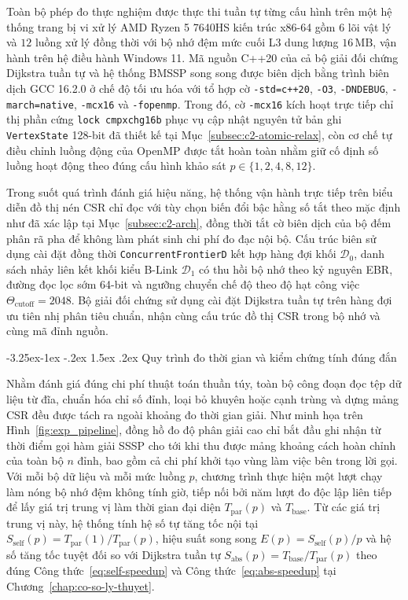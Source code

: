 \documentclass[12pt,a4paper,openany,oneside]{report}
\makeatletter
\theoremstyle{plain}
\renewcommand\subsection{\@startsection{subsection}{2}{\z@}
    {-3.25ex\@plus -1ex \@minus -.2ex}
    {1.5ex \@plus .2ex}
    {\normalfont\normalsize\bfseries}}
\numberwithin{equation}{section}
\makeatother
\begin{document}
Toàn bộ phép đo thực nghiệm được thực thi tuần tự từng cấu hình trên một hệ thống trang bị vi xử lý AMD Ryzen 5 7640HS kiến trúc x86-64 gồm $6$ lõi vật lý và $12$ luồng xử lý đồng thời với bộ nhớ đệm mức cuối L3 dung lượng $16\,\mathrm{MB}$, vận hành trên hệ điều hành Windows 11. Mã nguồn C++20 của cả bộ giải đối chứng Dijkstra tuần tự và hệ thống BMSSP song song được biên dịch bằng trình biên dịch GCC 16.2.0 ở chế độ tối ưu hóa với tổ hợp cờ \texttt{-std=c++20}, \texttt{-O3}, \texttt{-DNDEBUG}, \texttt{-march=native}, \texttt{-mcx16} và \texttt{-fopenmp}. Trong đó, cờ \texttt{-mcx16} kích hoạt trực tiếp chỉ thị phần cứng \texttt{lock cmpxchg16b} phục vụ cập nhật nguyên tử bản ghi \texttt{VertexState} 128-bit đã thiết kế tại Mục~\ref{subsec:c2-atomic-relax}, còn cơ chế tự điều chỉnh luồng động của OpenMP được tắt hoàn toàn nhằm giữ cố định số luồng hoạt động theo đúng cấu hình khảo sát $p \in \{1, 2, 4, 8, 12\}$.

Trong suốt quá trình đánh giá hiệu năng, hệ thống vận hành trực tiếp trên biểu diễn đồ thị nén CSR chỉ đọc với tùy chọn biến đổi bậc hằng số tắt theo mặc định như đã xác lập tại Mục~\ref{subsec:c2-arch}, đồng thời tắt cờ biên dịch của bộ đếm phân rã pha để không làm phát sinh chi phí đo đạc nội bộ. Cấu trúc biên sử dụng cài đặt đồng thời \texttt{Concurrent\allowbreak FrontierD} kết hợp hàng đợi khối $\mathcal{D}_0$, danh sách nhảy liên kết khối kiểu B-Link $\mathcal{D}_1$ có thu hồi bộ nhớ theo kỷ nguyên EBR, đường đọc lọc sớm 64-bit và ngưỡng chuyển chế độ theo độ hạt công việc $\Theta_{\mathrm{cutoff}} = 2048$. Bộ giải đối chứng sử dụng cài đặt Dijkstra tuần tự trên hàng đợi ưu tiên nhị phân tiêu chuẩn, nhận cùng cấu trúc đồ thị CSR trong bộ nhớ và cùng mã đỉnh nguồn.

\subsection{Quy trình đo thời gian và kiểm chứng tính đúng đắn}\label{subsec:c3-phuong-phap}

Nhằm đánh giá đúng chi phí thuật toán thuần túy, toàn bộ công đoạn đọc tệp dữ liệu từ đĩa, chuẩn hóa chỉ số đỉnh, loại bỏ khuyên hoặc cạnh trùng và dựng mảng CSR đều được tách ra ngoài khoảng đo thời gian giải. Như minh họa trên Hình~\ref{fig:exp_pipeline}, đồng hồ đo độ phân giải cao chỉ bắt đầu ghi nhận từ thời điểm gọi hàm giải SSSP cho tới khi thu được mảng khoảng cách hoàn chỉnh của toàn bộ $n$ đỉnh, bao gồm cả chi phí khởi tạo vùng làm việc bên trong lời gọi. Với mỗi bộ dữ liệu và mỗi mức luồng $p$, chương trình thực hiện một lượt chạy làm nóng bộ nhớ đệm không tính giờ, tiếp nối bởi năm lượt đo độc lập liên tiếp để lấy giá trị trung vị làm thời gian đại diện $T_{\mathrm{par}}(p)$ và $T_{\mathrm{base}}$. Từ các giá trị trung vị này, hệ thống tính hệ số tự tăng tốc nội tại $S_{\mathrm{self}}(p) = T_{\mathrm{par}}(1) / T_{\mathrm{par}}(p)$, hiệu suất song song $E(p) = S_{\mathrm{self}}(p) / p$ và hệ số tăng tốc tuyệt đối so với Dijkstra tuần tự $S_{\mathrm{abs}}(p) = T_{\mathrm{base}} / T_{\mathrm{par}}(p)$ theo đúng Công thức~\eqref{eq:self-speedup} và Công thức~\eqref{eq:abs-speedup} tại Chương~\ref{chap:co-so-ly-thuyet}.
\end{document}
